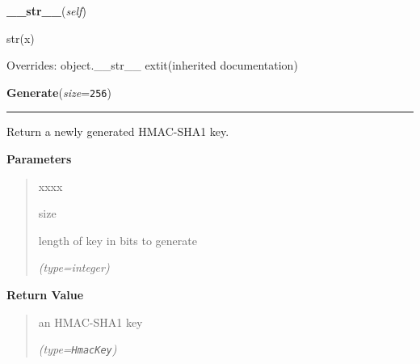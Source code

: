     \vspace{0.5ex}

\hspace{.8\funcindent}\begin{boxedminipage}{\funcwidth}

    \raggedright \textbf{\_\_str\_\_}(\textit{self})

\setlength{\parskip}{2ex}
    str(x)

\setlength{\parskip}{1ex}
      Overrides: object.\_\_str\_\_ 	extit{(inherited documentation)}

    \end{boxedminipage}

    \label{keyczar:keys:HmacKey:Generate}

    \vspace{0.5ex}

\hspace{.8\funcindent}\begin{boxedminipage}{\funcwidth}

    \raggedright \textbf{Generate}(\textit{size}={\tt 256})

    \vspace{-1.5ex}

    \rule{\textwidth}{0.5\fboxrule}
\setlength{\parskip}{2ex}
    Return a newly generated HMAC-SHA1 key.

\setlength{\parskip}{1ex}
      \textbf{Parameters}
      \vspace{-1ex}

      \begin{quote}
        \begin{Ventry}{xxxx}

          \item[size]

          length of key in bits to generate

            {\it (type=integer)}

        \end{Ventry}

      \end{quote}

      \textbf{Return Value}
    \vspace{-1ex}

      \begin{quote}
      an HMAC-SHA1 key

      {\it (type=\texttt{HmacKey})}

      \end{quote}

    \end{boxedminipage}

